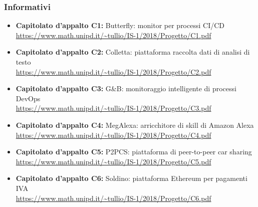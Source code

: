 \subsubsection{Informativi}
\begin{itemize}
\item \textbf{Capitolato d’appalto C1:} Butterfly: monitor per processi CI/CD\\
\url{https://www.math.unipd.it/~tullio/IS-1/2018/Progetto/C1.pdf}
\item \textbf{Capitolato d’appalto C2:} Colletta: piattaforma raccolta dati di analisi di testo\\
\url{https://www.math.unipd.it/~tullio/IS-1/2018/Progetto/C2.pdf}
\item \textbf{Capitolato d’appalto C3:} G\&{B}: monitoraggio intelligente di processi DevOps\\
\url{https://www.math.unipd.it/~tullio/IS-1/2018/Progetto/C3.pdf}
\item \textbf{Capitolato d’appalto C4:} MegAlexa: arricchitore di skill di Amazon Alexa\\
\url{https://www.math.unipd.it/~tullio/IS-1/2018/Progetto/C4.pdf}
\item \textbf{Capitolato d’appalto C5:} P2PCS: piattaforma di peer-to-peer car sharing	\\
\url{https://www.math.unipd.it/~tullio/IS-1/2018/Progetto/C5.pdf}
\item \textbf{Capitolato d’appalto C6:} Soldino: piattaforma Ethereum per pagamenti IVA\\
\url{https://www.math.unipd.it/~tullio/IS-1/2018/Progetto/C6.pdf}
\end{itemize}
